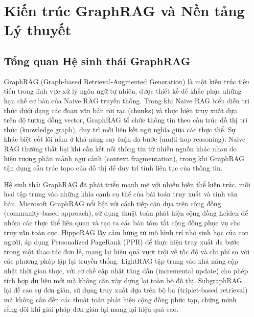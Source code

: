 
\chapter{Kiến trúc GraphRAG và Nền tảng Lý thuyết}
\label{chap:graphrag_theory}

\section{Tổng quan Hệ sinh thái GraphRAG}
\label{sec:graphrag_ecosystem}

GraphRAG (Graph-based Retrieval-Augmented Generation) là một kiến trúc tiên tiến trong lĩnh vực xử lý ngôn ngữ tự nhiên, được thiết kế để khắc phục những hạn chế cơ bản của Naive RAG truyền thống. Trong khi Naive RAG biểu diễn tri thức dưới dạng các đoạn văn bản rời rạc (chunks) và thực hiện truy xuất dựa trên độ tương đồng vector, GraphRAG tổ chức thông tin theo cấu trúc đồ thị tri thức (knowledge graph), duy trì mối liên kết ngữ nghĩa giữa các thực thể. Sự khác biệt cốt lõi nằm ở khả năng suy luận đa bước (multi-hop reasoning): Naive RAG thường thất bại khi cần kết nối thông tin từ nhiều nguồn khác nhau do hiện tượng phân mảnh ngữ cảnh (context fragmentation), trong khi GraphRAG tận dụng cấu trúc topo của đồ thị để duy trì tính liên tục của thông tin.

Hệ sinh thái GraphRAG đã phát triển mạnh mẽ với nhiều biến thể kiến trúc, mỗi loại tập trung vào những khía cạnh cụ thể của bài toán truy xuất và sinh văn bản. Microsoft GraphRAG \cite{edge2024graphrag} nổi bật với cách tiếp cận dựa trên cộng đồng (community-based approach), sử dụng thuật toán phát hiện cộng đồng Leiden để nhóm các thực thể liên quan và tạo ra các bản tóm tắt cộng đồng phục vụ cho truy vấn toàn cục. HippoRAG \cite{gutierrez2024hipporag} lấy cảm hứng từ mô hình trí nhớ sinh học của con người, áp dụng Personalized PageRank (PPR) để thực hiện truy xuất đa bước trong một thao tác đơn lẻ, mang lại hiệu quả vượt trội về tốc độ và chi phí so với các phương pháp lặp lại truyền thống. LightRAG \cite{guo2024lightrag} tập trung vào khả năng cập nhật thời gian thực, với cơ chế cập nhật tăng dần (incremental update) cho phép tích hợp dữ liệu mới mà không cần xây dựng lại toàn bộ đồ thị. SubgraphRAG \cite{subgraphrag2025} lại đề cao sự đơn giản, sử dụng truy xuất dựa trên bộ ba (triplet-based retrieval) mà không cần đến các thuật toán phát hiện cộng đồng phức tạp, chứng minh rằng đôi khi giải pháp đơn giản lại mang lại hiệu quả cao.

